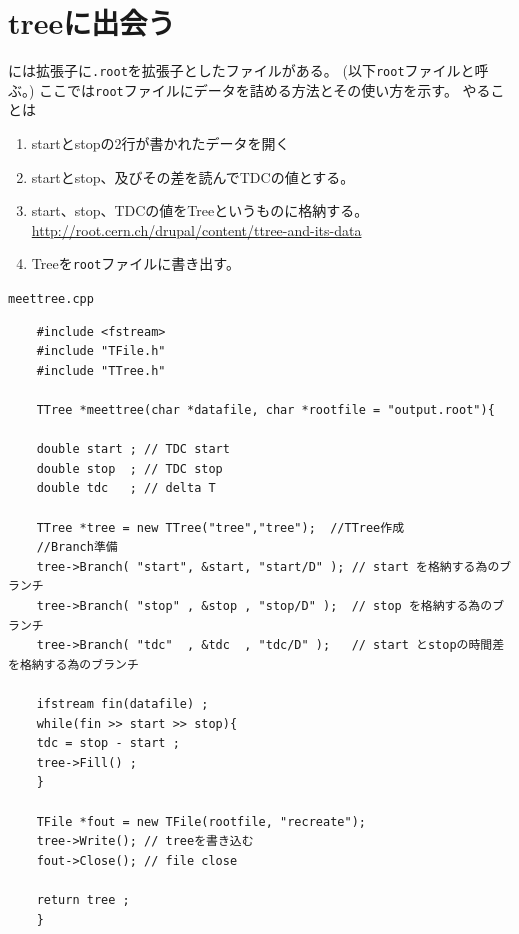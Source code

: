 \documentclass{jarticle}
\begin{document}
 \clearpage
 \section{treeに出会う}

 \ROOT には拡張子に\verb|.root|を拡張子としたファイルがある。
 (以下\verb|root|ファイルと呼ぶ。)
 ここでは\verb|root|ファイルにデータを詰める方法とその使い方を示す。
 やることは
 \begin{enumerate}
  \item startとstopの2行が書かれたデータを開く
  \item startとstop、及びその差を読んでTDCの値とする。
  \item start、stop、TDCの値をTreeというものに格納する。\\
	\url{http://root.cern.ch/drupal/content/ttree-and-its-data}
  \item Treeを\verb|root|ファイルに書き出す。
 \end{enumerate}

 \begin{itembox}{\texttt{meettree.cpp}}
\begin{verbatim}
	#include <fstream>
	#include "TFile.h"
	#include "TTree.h"

	TTree *meettree(char *datafile, char *rootfile = "output.root"){

	double start ; // TDC start
	double stop  ; // TDC stop
	double tdc   ; // delta T

	TTree *tree = new TTree("tree","tree");  //TTree作成
	//Branch準備
	tree->Branch( "start", &start, "start/D" ); // start を格納する為のブランチ
	tree->Branch( "stop" , &stop , "stop/D" );  // stop を格納する為のブランチ
	tree->Branch( "tdc"  , &tdc  , "tdc/D" );   // start とstopの時間差 を格納する為のブランチ

	ifstream fin(datafile) ;
	while(fin >> start >> stop){
	tdc = stop - start ;
	tree->Fill() ;
	}

	TFile *fout = new TFile(rootfile, "recreate");
	tree->Write(); // treeを書き込む
	fout->Close(); // file close

	return tree ;
	}
\end{verbatim}
 \end{itembox}
\end{document}
